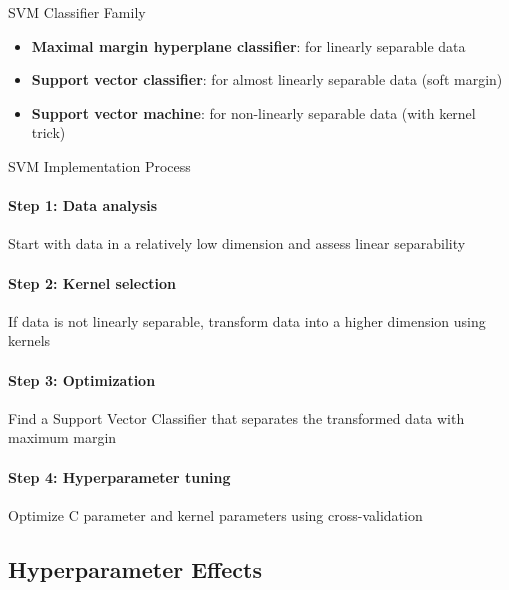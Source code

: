 
\begin{concept}{SVM Classifier Family}
\begin{itemize}
    \item \textbf{Maximal margin hyperplane classifier}: for linearly separable data
    \item \textbf{Support vector classifier}: for almost linearly separable data (soft margin)
    \item \textbf{Support vector machine}: for non-linearly separable data (with kernel trick)
\end{itemize}
\end{concept}

\begin{KR}{SVM Implementation Process}\\
\paragraph{Step 1: Data analysis}
Start with data in a relatively low dimension and assess linear separability

\paragraph{Step 2: Kernel selection}
If data is not linearly separable, transform data into a higher dimension using kernels

\paragraph{Step 3: Optimization}
Find a Support Vector Classifier that separates the transformed data with maximum margin

\paragraph{Step 4: Hyperparameter tuning}
Optimize C parameter and kernel parameters using cross-validation
\end{KR}


\subsection{Hyperparameter Effects}


